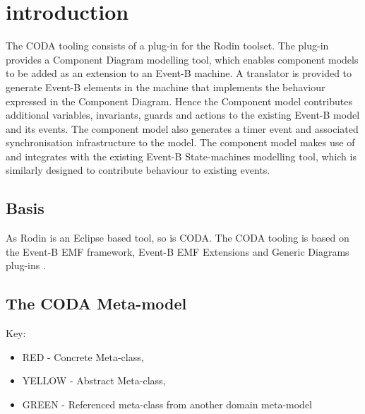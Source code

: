 \section{introduction}
\label{sec:component_diagrams-introduction}

The CODA tooling consists of a plug-in for the Rodin toolset. The plug-in provides a Component Diagram modelling tool, which enables component models to be added as an extension to an Event-B machine. A translator is provided to generate Event-B elements in the machine that implements the behaviour expressed in the Component Diagram. Hence the Component model contributes additional variables, invariants, guards and actions to the existing Event-B model and its events. The component model also generates a timer event and associated synchronisation infrastructure to the model. The component model makes use of and integrates with the existing Event-B State-machines  modelling tool, which is similarly designed to contribute behaviour to existing events.

\subsection{Basis}
As Rodin is an Eclipse based tool, so is CODA. The CODA tooling is based on the Event-B EMF framework, Event-B EMF Extensions and Generic Diagrams plug-ins .

\subsection{The CODA Meta-model}
Key:
\begin{itemize}
\item  RED - Concrete Meta-class,
\item  YELLOW - Abstract Meta-class,
\item  GREEN - Referenced meta-class from another domain meta-model
\end{itemize}


